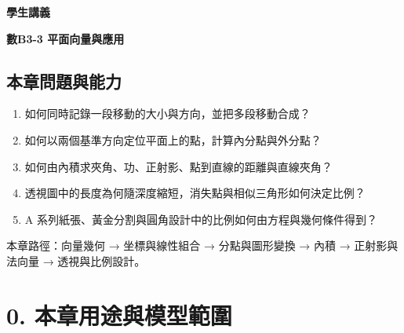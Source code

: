 \documentclass[11pt,a4paper]{article}
\providecommand{\tightlist}{%
  \setlength{\itemsep}{0pt}\setlength{\parskip}{0pt}}
\begin{document}
\begin{tcolorbox}[
  enhanced,colback=white,colframe=HandoutBlue,boxrule=1.1pt,arc=2mm,
  borderline west={3pt}{0pt}{HandoutBlue},left=5mm,right=4mm,top=4mm,bottom=4mm
]
{\sffamily\small\bfseries\color{HandoutBlue}學生講義}\par
{\sffamily\bfseries\LARGE\color{HandoutInk}數B3-3 平面向量與應用}\par
\vspace{0.35em}{\large 用大小與方向統一處理位移、比例、投影、直線、透視與平面設計}\par
{}\par
{}\par
\end{tcolorbox}


\begin{HandoutLearningMap}

\subsection{本章問題與能力}\label{ux672cux7ae0ux554fux984cux8207ux80fdux529b}

\begin{enumerate}
\def\labelenumi{\arabic{enumi}.}
\tightlist
\item
  如何同時記錄一段移動的大小與方向，並把多段移動合成？
\item
  如何以兩個基準方向定位平面上的點，計算內分點與外分點？
\item
  如何由內積求夾角、功、正射影、點到直線的距離與直線夾角？
\item
  透視圖中的長度為何隨深度縮短，消失點與相似三角形如何決定比例？
\item
  A 系列紙張、黃金分割與圓角設計中的比例如何由方程與幾何條件得到？
\end{enumerate}

本章路徑：向量幾何 → 坐標與線性組合 → 分點與圖形變換 → 內積 → 正射影與法向量 → 透視與比例設計。

\end{HandoutLearningMap}

\section{0. 本章用途與模型範圍}\label{ux672cux7ae0ux7528ux9014ux8207ux6a21ux578bux7bc4ux570d}
\end{document}
